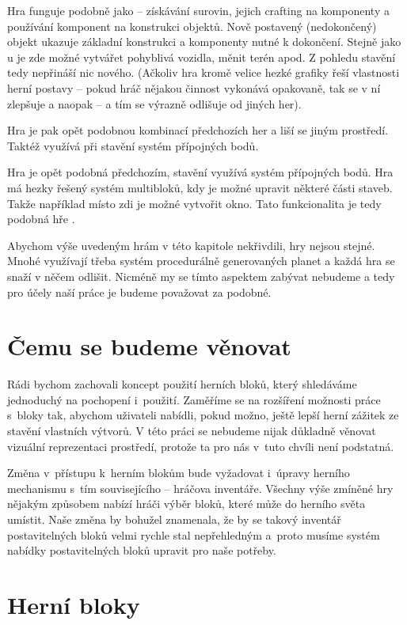 Hra \PN{} funguje podobně jako \SE{} -- získávání surovin, jejich crafting na komponenty a používání komponent na konstrukci objektů. Nově postavený (nedokončený) objekt ukazuje základní konstrukci a komponenty nutné k dokončení. Stejně jako u \SE{} je zde možné vytvářet pohyblivá vozidla, měnit terén apod. Z pohledu stavění tedy nepřináší nic nového. (Ačkoliv hra kromě velice hezké grafiky řeší vlastnosti herní postavy -- pokud hráč nějakou činnost vykonává opakovaně, tak se v ní zlepšuje a naopak -- a tím se výrazně odlišuje od jiných her).


Hra \ARK{} je pak opět podobnou kombinací předchozích her a liší se jiným prostředí. Taktéž využívá při stavění systém přípojných bodů.

Hra \NMS{} je opět podobná předchozím, stavění využívá systém přípojných bodů. Hra má hezky řešený systém multibloků, kdy je možné upravit některé části staveb. Takže například místo zdi je možné vytvořit okno. Tato funkcionalita je tedy podobná hře \SE{}.

Abychom výše uvedeným hrám v této kapitole nekřivdili, hry nejsou stejné. Mnohé využívají třeba systém procedurálně generovaných planet a každá hra se snaží v něčem odlišit. Nicméně my se tímto aspektem zabývat nebudeme a tedy pro účely naší práce je budeme považovat za podobné.

\section{Čemu se budeme věnovat}

Rádi bychom zachovali koncept použití herních bloků, který shledáváme jednoduchý na pochopení i~použití. Zaměříme se na rozšíření možnosti práce s~bloky tak, abychom uživateli nabídli, pokud možno, ještě lepší herní zážitek ze stavění vlastních výtvorů. V této práci se nebudeme nijak důkladně věnovat vizuální reprezentaci prostředí, protože ta pro nás v~tuto chvíli není podstatná.

Změna v~přístupu k~herním blokům bude vyžadovat i~úpravy herního mechanismu s~tím souvisejícího -- hráčova inventáře. Všechny výše zmíněné hry nějakým způsobem nabízí hráči výběr bloků, které může do herního světa umístit. Naše změna by bohužel znamenala, že by se takový inventář postavitelných bloků velmi rychle stal nepřehledným a~proto musíme systém nabídky postavitelných bloků upravit pro naše potřeby.

\section{Herní bloky}




